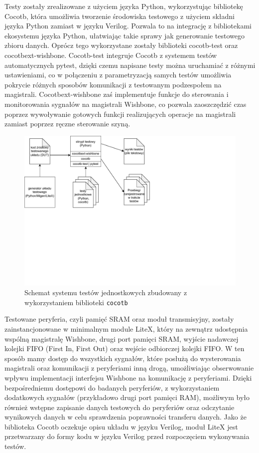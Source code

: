 Testy zostały zrealizowane z użyciem języka Python, wykorzystując bibliotekę Cocotb, która umożliwia tworzenie środowiska testowego z użyciem składni języka Python zamiast w języku Verilog. Pozwala to na integrację z bibliotekami ekosystemu języka Python, ułatwiając takie sprawy jak generowanie testowego zbioru danych.
Oprócz tego wykorzystane zostały biblioteki cocotb-test\cite{cocotb-test} oraz cocotbext-wishbone. Cocotb-test integruje Cocotb z systemem testów automatycznych pytest\cite{pytest6.2}, dzięki czemu napisane testy można uruchamiać z różnymi ustawieniami, co w połączeniu z parametryzacją samych testów umożliwia pokrycie różnych sposobów komunikacji z testowanym podzespołem na magistrali. Cocotbext-wishbone zaś implementuje funkcje do sterowania i monitorowania sygnałów na magistrali Wishbone, co pozwala zaoszczędzić czas poprzez wywoływanie gotowych funkcji realizujących operacje na magistrali zamiast poprzez ręczne sterowanie szyną.

\begin{figure}[H]
    \centering
    \includegraphics[scale=1,trim={0 7.7cm 8.5cm 0},clip]{testing/testing-pipeline.pdf}
    \caption{Schemat systemu testów jednostkowych zbudowany z wykorzystaniem biblioteki \texttt{cocotb}}
    \label{fig:testing-pipeline}
\end{figure}

Testowane peryferia, czyli pamięć SRAM oraz moduł transmisyjny, zostały zainstancjonowane w minimalnym module LiteX, który na zewnątrz udostępnia wspólną magistralę Wishbone, drugi port pamięci SRAM, wyjście nadawczej kolejki FIFO (First In, First Out) oraz wejście odbiorczej kolejki FIFO. W ten sposób mamy dostęp do wszystkich sygnałów, które posłużą do wysterowania magistrali oraz komunikacji z peryferiami inną drogą, umożliwiając obserwowanie wpływu implementacji interfejsu Wishbone na komunikację z peryferiami. Dzięki bezpośredniemu dostępowi do badanych peryferiów, z wykorzystaniem dodatkowych sygnałów (przykładowo drugi port pamięci RAM), możliwym było również wstępne zapisanie danych testowych do peryferiów oraz odczytanie wynikowych danych w celu sprawdzenia poprawności transferu danych. Jako że biblioteka Cocotb oczekuje opisu układu w języku Verilog, moduł LiteX jest przetwarzany do formy kodu w języku Verilog przed rozpoczęciem wykonywania testów.

